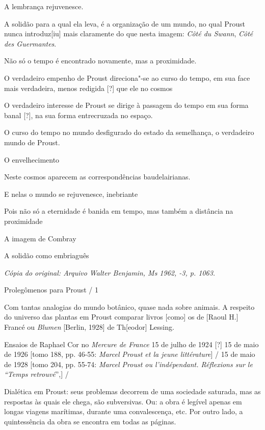 A lembrança rejuvenesce.

A solidão para a qual ela leva, é a organização de um mundo, no qual
Proust nunca introduz{[}iu{]} mais claramente do que nesta imagem:
\emph{Côté du Swann}, \emph{Côté des Guermantes}.

Não só o tempo é encontrado novamente, mas a proximidade.

O verdadeiro empenho de Proust direciona"-se ao curso do tempo, em sua
face mais verdadeira, menos redigida {[}?{]} que ele no cosmos

O verdadeiro interesse de Proust se dirige à passagem do tempo em sua
forma banal {[}?{]}, na sua forma entrecruzada no espaço.

O curso do tempo no mundo desfigurado do estado da semelhança, o
verdadeiro mundo de Proust.

O envelhecimento

Neste cosmos aparecem as correspondências baudelairianas.

E nelas o mundo se rejuvenesce, inebriante

Pois não só a eternidade é banida em tempo, mas também a distância na
proximidade

A imagem de Combray

A solidão como embriaguês


\begin{flushright}
\emph{\small{Cópia do original: Arquivo Walter Benjamin, Ms 1962, -3, p. 1063.}}
\end{flushright}

Prolegômenos para Proust / 1

Com tantas analogias do mundo botânico, quase nada sobre animais. A
respeito do universo das plantas em Proust comparar livros {[}como{]} os
de {[}Raoul H.{]} Francé ou \emph{Blumen} {[}Berlin, 1928{]} de Th{[}eodor{]} Lessing.

Ensaios de Raphael Cor no \emph{Mercure de France} 15 de julho de 1924
{[}?{]} 15 de maio de 1926 {[}tomo 188, pp. 46-55: \emph{Marcel Proust et
la jeune littérature}{]} / 15 de maio de 1928 {[}tomo 204, pp. 55-74:
\emph{Marcel Proust ou l'indépendant. Réflexions sur le ``Temps
retrouvé}'',{]} /

Dialética em Proust: seus problemas decorrem de uma sociedade saturada,
mas as respostas às quais ele chega, são subversivas. Ou: a obra é
legível apenas em longas viagens marítimas, durante uma convalescença,
etc. Por outro lado, a quintessência da obra se encontra em todas as
páginas.

